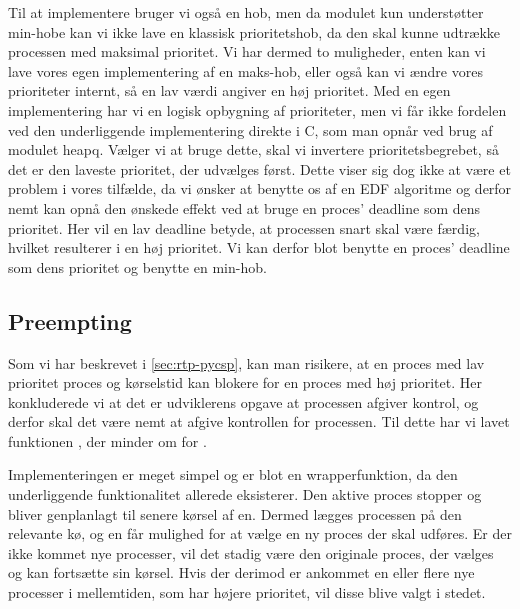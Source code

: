 Til at implementere  bruger vi også en hob, men da modulet  kun understøtter min-hobe kan vi ikke lave en klassisk prioritetshob, da den skal kunne udtrække processen med maksimal prioritet. Vi har dermed to muligheder, enten kan vi lave vores egen implementering af en maks-hob, eller også kan vi ændre vores prioriteter internt, så en lav værdi angiver en høj prioritet. Med en egen implementering har vi en  logisk opbygning af prioriteter, men vi får ikke fordelen ved den underliggende implementering  direkte i C, som man opnår ved brug af modulet heapq. Vælger vi at bruge dette, skal vi invertere prioritetsbegrebet, så det er den laveste prioritet, der udvælges først. Dette viser  sig dog ikke at være et problem  i vores tilfælde, da vi ønsker at benytte os af en EDF algoritme og derfor nemt kan opnå den ønskede effekt ved at bruge en proces' deadline som dens prioritet. Her vil en lav deadline betyde, at processen snart skal være færdig, hvilket resulterer i en høj prioritet.
Vi kan derfor blot benytte en proces' deadline som dens prioritet og benytte en min-hob. 


\subsection{Preempting}

Som vi har beskrevet i \cref{sec:rtp-pycsp}, kan  man risikere, at en proces med lav prioritet proces og kørselstid kan blokere for en proces med høj prioritet. 
Her konkluderede vi at det er udviklerens opgave at processen afgiver kontrol, og derfor skal det være nemt at afgive kontrollen for processen. Til dette har vi lavet funktionen , der minder om  for .

Implementeringen er meget simpel og er blot en wrapperfunktion, da den underliggende funktionalitet allerede eksisterer. Den aktive proces stopper og bliver genplanlagt til senere kørsel af \sched en. Dermed lægges processen på den relevante kø, og  \sched en får mulighed for at vælge en ny proces der skal udføres. Er der ikke kommet nye processer, vil det stadig være den originale proces, der vælges og kan fortsætte sin kørsel. Hvis der derimod er ankommet en eller flere nye processer i mellemtiden, som har højere prioritet, vil disse blive valgt i stedet.

